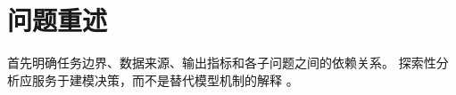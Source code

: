 \section{问题重述}

首先明确任务边界、数据来源、输出指标和各子问题之间的依赖关系。
探索性分析应服务于建模决策，而不是替代模型机制的解释
\cite{tukey1977exploratory}。
